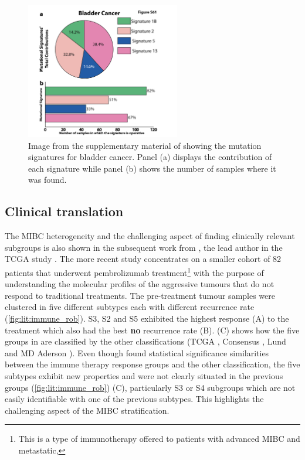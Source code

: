 \begin{figure}[!htb]    
    \centering
\includegraphics[width=0.6\textwidth,height=0.6\textheight,keepaspectratio]{Sections/Lit_review/Resources/bladder_mut_sig.png}
    \caption{Image from the supplementary material of \cite{Alexandrov2013-gi} showing the mutation signatures for bladder cancer. Panel (a) displays the contribution of each signature while panel (b) shows the number of samples where it was found.}
    \label{fig:lit:bladder_mut_sig}
\end{figure}


\subsection{Clinical translation} \label{s:lit:clinical}


The MIBC heterogeneity and the challenging aspect of finding clinically relevant subgroups is also shown in the subsequent work from \citet{Robertson2023-na}, the lead author in the TCGA study \cite{Robertson2017-mg}. The more recent study concentrates on a smaller cohort of 82 patients that underwent pembrolizumab treatment\footnote{This is a type of immunotherapy offered to patients with advanced MIBC and metastatic,} with the purpose of understanding the molecular profiles of the aggressive tumours that do not respond to traditional treatments. The pre-treatment tumour samples were clustered in five different subtypes each with different recurrence rate (\cref{fig:lit:immune_rob}). S3, S2 and S5 exhibited the highest response (A) to the treatment which also had the best \textbf{no} recurrence rate (B).  (C) shows how the five groups in \cite{Robertson2023-na} are classified by the other classifications (TCGA \cite{Robertson2017-mg}, Consensus \cite{Kamoun2020-tj}, Lund \cite{Marzouka2018-ge} and MD Aderson \cite{Dadhania2016-cb}). Even though \citet{Robertson2023-na} found statistical significance similarities between the immune therapy response groups and the other classification, the five subtypes exhibit new properties and were not clearly situated in the previous groups (\cref{fig:lit:immune_rob}) (C), particularly S3 or S4 subgroups which are not easily identifiable with one of the previous subtypes. This highlights the challenging aspect of the MIBC stratification.


